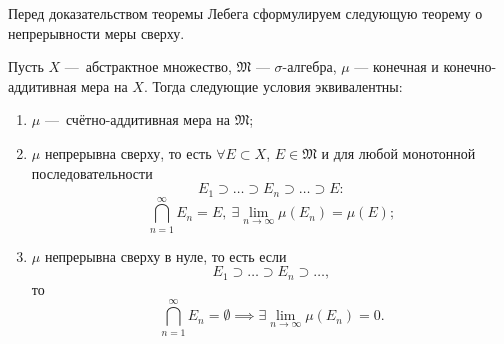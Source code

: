 Перед доказательством теоремы Лебега сформулируем следующую теорему о непрерывности меры сверху.

\begin{theorem}
    Пусть $X$ — абстрактное множество, $\mathfrak{M}$ — $\sigma$-алгебра, $\mu$ — конечная и конечно-аддитивная мера на $X$.
    Тогда следующие условия эквивалентны:
    \begin{enumerate}
        \item $\mu$ — счётно-аддитивная мера на $\mathfrak{M}$;
        \item $\mu$ непрерывна сверху, то есть $\forall E \subset X$, $E \in \mathfrak{M}$ и для любой монотонной последовательности
        \[E_1 \supset \dots \supset E_n \supset \dots \supset E:\]
        \[\bigcap\limits_{n=1}^{\infty}E_n = E, \ \exists \lim\limits_{n \to \infty} \mu(E_n) = \mu(E);\]
        \item $\mu$ непрерывна сверху в нуле, то есть если
        \[E_1 \supset \dots \supset E_n \supset \dots,\]
        то
        \[\bigcap\limits_{n=1}^{\infty} E_n = \emptyset
        \implies
        \exists \lim\limits_{n \to \infty} \mu(E_n) = 0.\]
    \end{enumerate}
\end{theorem} 
